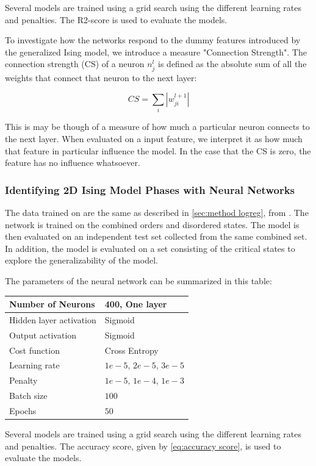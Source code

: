 Several models are trained using a grid search using the different learning rates 
and penalties. The R2-score is used to evaluate the models.

To investigate how the networks respond to the dummy features introduced by the generalized Ising model, we introduce a measure "Connection Strength". The connection strength (CS) of a neuron $n^l_j$ is defined as the absolute sum of all the weights that connect that neuron to the next layer:

\begin{equation}\label{eq:CS}
    CS = \sum_i |w^{l+1}_{ji}|
\end{equation}

This is may be though of a measure of how much a particular neuron connects to the next layer. When evaluated on a input feature, we interpret it as how much that feature in particular influence the model. In the case that the CS is zero, the feature has no influence whatsoever.

\subsubsection{Identifying 2D Ising Model Phases with Neural Networks}
The data trained on are the same as described in \autoref{sec:method logreg}, from \cite{Mehta_2019}. The network is trained on the combined orders and disordered states. The model is then evaluated on an independent test set collected from the same combined set. In addition, the model is evaluated on a set consisting of the critical states to explore the generalizability of the model. 

The parameters of the neural network can be summarized in this table:

\begin{table}[H]
\begin{tabular}{|l|l|}
\hline
Number of Neurons & 400, One layer  \\ \hline
Hidden layer activation & Sigmoid   \\ \hline
Output activation & Sigmoid  \\ \hline
Cost function & Cross Entropy \\ \hline
Learning rate & $1e-5$, $2e-5$, $3e-5$  \\ \hline
Penalty & $1e-5$, $1e-4$, $1e-3$  \\ \hline
Batch size & $100$  \\ \hline
Epochs & $50$  \\ \hline
\end{tabular}
\end{table}

Several models are trained using a grid search using the different learning rates 
and penalties. The accuracy score, given by \autoref{eq:accuracy score}, is used to evaluate the models.
